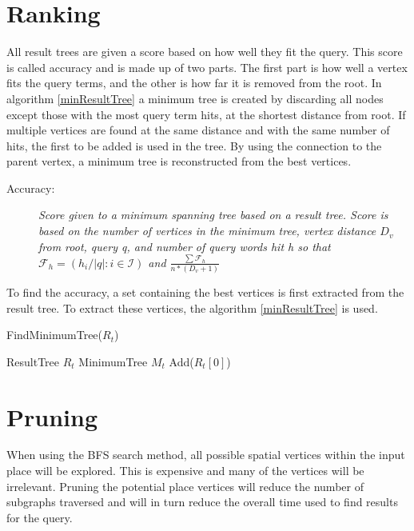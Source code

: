 \section{Ranking}
All result trees are given a score based on how well they fit the query. This score is called accuracy and is made up of two parts. The first part is how well a vertex fits the query terms, and the other is how far it is removed from the root. In algorithm \ref{minResultTree} a minimum tree is created by discarding all nodes except those with the most query term hits, at the shortest distance from root. If multiple vertices are found at the same distance and with the same number of hits, the first to be added is used in the tree. By using the connection to the parent vertex, a minimum tree is reconstructed from the best vertices.
\begin{description}
    \item[Accuracy:] {\em Score given to a minimum spanning tree based on a result tree. Score is based on the number of vertices  in the minimum tree, vertex distance $D_v$ from root, query q, and number of query words hit h so that $\mathcal{F}_h = (h_i/\left\lvert q \right\rvert : i \in \mathcal{I})$ and $ \frac{\sum \mathcal{F}_h}{n*(D_v+1)}$}
\end{description}
To find the accuracy, a set containing the best vertices is first extracted from the result tree. To extract these vertices, the algorithm \ref{minResultTree} is used.
\begin{algorithm}
    \caption{FindMinimumTree($R_t$)}
    \label{minResultTree}
    \SetAlgoLined
    ResultTree $R_t$\; MinimumTree $M_t$ Add($R_t[0]$)\;
\end{algorithm}

\section{Pruning}
\label{pruning}
When using the BFS search method, all possible spatial vertices within the input place will be explored. This is expensive and many of the vertices will be irrelevant. Pruning the potential place vertices will reduce the number of subgraphs traversed and will in turn reduce the overall time used to find results for the query.

